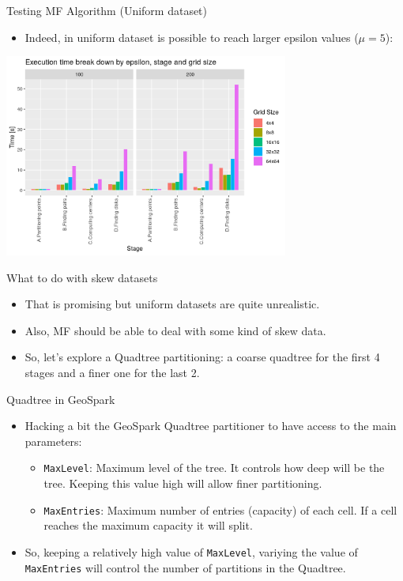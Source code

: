 \documentclass{beamer}
\begin{document}
\begin{frame}{Testing MF Algorithm (Uniform dataset)}
    \begin{itemize}
        \item Indeed, in uniform dataset is possible to reach larger epsilon values ($\mu=5$):
    \end{itemize}
    \centering
    \includegraphics[width=0.7\textwidth]{figures/04_uniformLargeByStages.png}
\end{frame}

\begin{frame}{What to do with skew datasets}
    \begin{itemize}
        \item That is promising but uniform datasets are quite unrealistic.
        \item Also, MF should be able to deal with some kind of skew data.
        \item So, let's explore a Quadtree partitioning:  a coarse quadtree for the first 4 stages and a finer one for the last 2.
    \end{itemize}
\end{frame}

\begin{frame}{Quadtree in GeoSpark}
    \begin{itemize}
        \item Hacking a bit the GeoSpark Quadtree partitioner to have access to the main parameters:
        \begin{itemize}
            \item \texttt{MaxLevel}: Maximum level of the tree.  It controls how deep will be the tree.  Keeping this value high will allow finer partitioning.
            \item \texttt{MaxEntries}: Maximum number of entries (capacity) of each cell.  If a cell reaches the maximum capacity it will split.
        \end{itemize}
        \item So, keeping a relatively high value of \texttt{MaxLevel}, variying the value of \texttt{MaxEntries} will control the number of partitions in the Quadtree.
    \end{itemize}
\end{frame}
\end{document}
